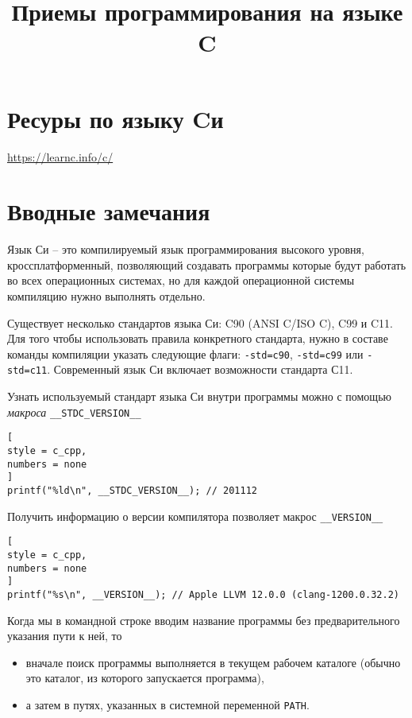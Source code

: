 \documentclass[%
	11pt,
	a4paper,
	utf8,
		]{article}
\begin{document}
\title{Приемы программирования на языке C}

\author{}

\date{}
\maketitle

\thispagestyle{fancy}

\tableofcontents

\section{Ресуры по языку Cи}

\url{https://learnc.info/c/}

\section{Вводные замечания}

Язык Си -- это компилируемый язык программирования высокого уровня, кроссплатформенный, позволяющий создавать программы которые будут работать во всех операционных системах, но для каждой операционной системы компиляцию нужно выполнять отдельно. 

Существует несколько стандартов языка Си: C90 (ANSI C/ISO C), C99 и C11. Для того чтобы использовать правила конкретного стандарта, нужно в составе команды компиляции указать следующие флаги: \verb*|-std=c90|, \verb|-std=c99| или \verb*|-std=c11|. Современный язык Си включает возможности стандарта С11.

Узнать используемый стандарт языка Си внутри программы можно с помощью \emph{макроса} \verb|__STDC_VERSION__|
\begin{lstlisting}[
style = c_cpp,
numbers = none	
]
printf("%ld\n", __STDC_VERSION__); // 201112
\end{lstlisting}

Получить информацию о версии компилятора позволяет макрос \verb*|__VERSION__|
\begin{lstlisting}[
style = c_cpp,
numbers = none	
]
printf("%s\n", __VERSION__); // Apple LLVM 12.0.0 (clang-1200.0.32.2)
\end{lstlisting}

Когда мы в командной строке вводим название программы без предварительного указания пути к ней, то
\begin{itemize}
	\item вначале поиск программы выполняется в текущем рабочем каталоге (обычно это каталог, из которого запускается программа),
	
	\item а затем в путях, указанных в системной переменной \verb|PATH|.
\end{itemize}
\end{document}
